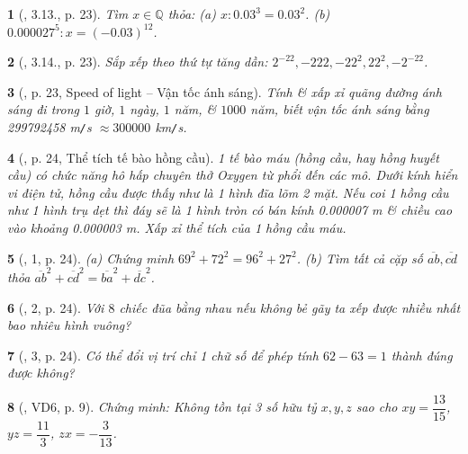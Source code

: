 \documentclass{article}
\newtheorem{baitoan}{}
\begin{document}
\begin{baitoan}[\cite{Binh_boi_duong_Toan_7_tap_1}, 3.13., p. 23]
	Tìm $x\in\mathbb{Q}$ thỏa: (a) $x:0.03^3 = 0.03^2$. (b) $0.000027^5:x = (-0.03)^{12}$.
\end{baitoan}

\begin{baitoan}[\cite{Binh_boi_duong_Toan_7_tap_1}, 3.14., p. 23]
	Sắp xếp theo thứ tự tăng dần: $2^{-22},-222,-22^2,22^2,-2^{-22}$.
\end{baitoan}

\begin{baitoan}[\cite{Binh_boi_duong_Toan_7_tap_1}, p. 23, Speed of light -- Vận tốc ánh sáng]
	Tính \& xấp xỉ quãng đường ánh sáng đi trong $1$ giờ, $1$ ngày, $1$ năm, \& $1000$ năm, biết vận tốc ánh sáng bằng {\rm299792458 m{\tt/}s} $\approx300000$ {\rm km{\tt/}s}.
\end{baitoan}

\begin{baitoan}[\cite{Binh_boi_duong_Toan_7_tap_1}, p. 24, Thể tích tế bào hồng cầu]
	1 tế bào máu (hồng cầu, hay hồng huyết cầu) có chức năng hô hấp chuyên thở Oxygen từ phổi đến các mô. Dưới kính hiển vi điện tử, hồng cầu được thấy như là 1 hình đĩa lõm 2 mặt. Nếu coi 1 hồng cầu như 1 hình trụ dẹt thì đáy sẽ là 1 hình tròn có bán kính {\rm0.000007 m} \& chiều cao vào khoảng {\rm0.000003 m}. Xấp xỉ thể tích của 1 hồng cầu máu.
\end{baitoan}

\begin{baitoan}[\cite{Binh_boi_duong_Toan_7_tap_1}, 1, p. 24]
	(a) Chứng minh $69^2 + 72^2 = 96^2 + 27^2$. (b) Tìm tất cả cặp số $\overline{ab},\overline{cd}$ thỏa $\overline{ab}^2 + \overline{cd}^2 = \overline{ba}^2 + \overline{dc}^2$.
\end{baitoan}

\begin{baitoan}[\cite{Binh_boi_duong_Toan_7_tap_1}, 2, p. 24]
	Với $8$ chiếc đũa bằng nhau nếu không bẻ gãy ta xếp được nhiều nhất bao nhiêu hình vuông?
\end{baitoan}

\begin{baitoan}[\cite{Binh_boi_duong_Toan_7_tap_1}, 3, p. 24]
	Có thể đổi vị trí chỉ 1 chữ số để phép tính $62 - 63 = 1$ thành đúng được không?
\end{baitoan}

\begin{baitoan}[\cite{Tuyen_Toan_7}, VD6, p. 9]
	Chứng minh: Không tồn tại 3 số hữu tỷ $x,y,z$ sao cho $xy = \dfrac{13}{15}$, $yz = \dfrac{11}{3}$, $zx = -\dfrac{3}{13}$.
\end{baitoan}
\end{document}

